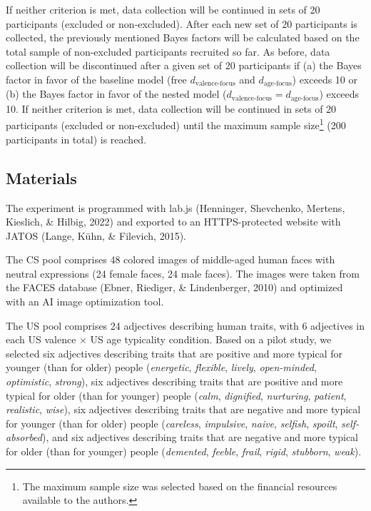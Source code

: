 \documentclass[
  doc,floatsintext]{apa6}
\begin{document}
If neither criterion is met, data collection will be continued in sets of 20 participants (excluded or non-excluded).
After each new set of 20 participants is collected, the previously mentioned Bayes factors will be calculated based on the total sample of non-excluded participants recruited so far.
As before, data collection will be discontinued after a given set of 20 participants if (a) the Bayes factor in favor of the baseline model (free \(d_\textrm{valence-focus}\) and \(d_\textrm{age-focus}\)) exceeds 10 or (b)
the Bayes factor in favor of the nested model (\(d_\textrm{valence-focus}=d_\textrm{age-focus}\)) exceeds 10.
If neither criterion is met, data collection will be continued in sets of 20 participants (excluded or non-excluded) until the maximum sample size\footnote{The maximum sample size was selected based on the financial resources available to the authors.} (200 participants in total) is reached.

\subsection{Materials}\label{materials}

The experiment is programmed with lab.js (Henninger, Shevchenko, Mertens, Kieslich, \& Hilbig, 2022) and exported to an HTTPS-protected website with JATOS (Lange, Kühn, \& Filevich, 2015).

The CS pool comprises 48 colored images of middle-aged human faces with neutral expressions (24 female faces, 24 male faces).
The images were taken from the FACES database (Ebner, Riediger, \& Lindenberger, 2010) and optimized with an AI image optimization tool.

The US pool comprises 24 adjectives describing human traits, with 6 adjectives in each US valence \(\times\) US age typicality condition.
Based on a pilot study, we selected six adjectives describing traits that are positive and more typical for younger (than for older) people (\emph{energetic}, \emph{flexible}, \emph{lively}, \emph{open-minded}, \emph{optimistic}, \emph{strong}), six adjectives describing traits that are positive and more typical for older (than for younger) people (\emph{calm}, \emph{dignified}, \emph{nurturing}, \emph{patient}, \emph{realistic}, \emph{wise}), six adjectives describing traits that are negative and more typical for younger (than for older) people (\emph{careless}, \emph{impulsive}, \emph{naive}, \emph{selfish}, \emph{spoilt}, \emph{self-absorbed}), and six adjectives describing traits that are negative and more typical for older (than for younger) people (\emph{demented}, \emph{feeble}, \emph{frail}, \emph{rigid}, \emph{stubborn}, \emph{weak}).
\end{document}

